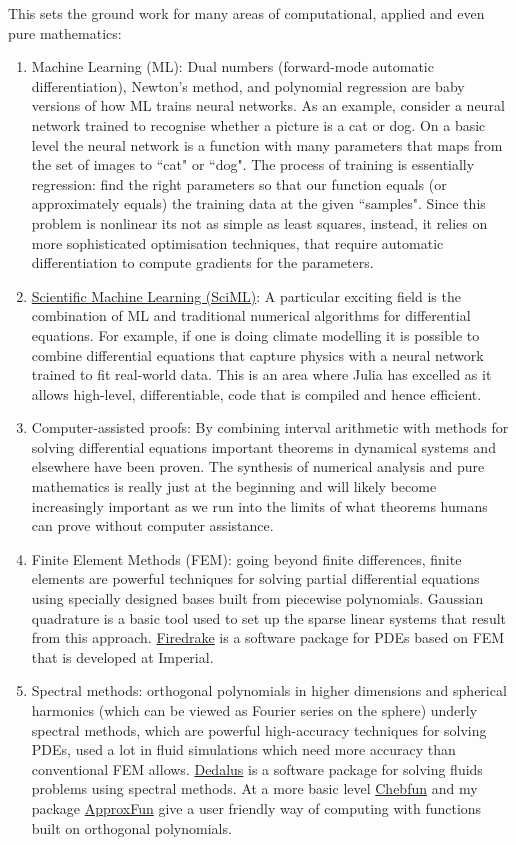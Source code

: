 \documentclass[12pt,a4paper]{book}
\theoremstyle{definition}
\begin{document}
This sets the ground work for many areas of computational, applied and even pure mathematics:

\begin{enumerate}
\item Machine Learning (ML): Dual numbers (forward-mode automatic differentiation), Newton's method, and polynomial regression
 are baby versions of how ML trains neural networks.  As an example, consider a neural network trained to recognise whether a picture
 is a cat or dog. On a basic level the neural network is a function with many parameters that maps from the set of images to ``cat" or ``dog". 
 The process of training is essentially regression: find the right parameters so that our function equals (or approximately equals) the
 training data at the given ``samples". Since this problem is nonlinear its not as simple as least squares, instead, it relies on more sophisticated
 optimisation techniques, that require automatic differentiation to compute gradients for the parameters.
\item \href{https://sciml.ai}{Scientific Machine Learning (SciML)}: A particular exciting field is the combination of ML and traditional numerical algorithms for differential equations.
For example, if one is doing climate modelling it is possible to combine differential equations that capture physics with a neural network  trained to 
fit real-world data. This is an area where Julia has excelled as it allows high-level, differentiable, code that is compiled and hence efficient.
 \item Computer-assisted proofs: By combining interval arithmetic with methods for solving differential equations important theorems in dynamical
 systems and elsewhere have been proven. The synthesis of numerical analysis and pure mathematics is really just at the beginning and will likely
 become increasingly important as we run into the limits of what theorems humans can prove without computer assistance.
\item Finite Element Methods (FEM): going beyond finite differences, finite elements are powerful techniques for solving partial differential
equations using specially designed bases built from piecewise polynomials. Gaussian quadrature is a basic tool used to set up the
sparse linear systems that result from this approach. \href{https://www.firedrakeproject.org}{Firedrake} is a software package for
PDEs based on FEM that is developed at Imperial.
\item Spectral methods: orthogonal polynomials in higher dimensions and spherical harmonics (which can be viewed as Fourier series on the sphere)
underly spectral methods, which are powerful high-accuracy techniques for solving PDEs, used a lot in fluid simulations which
need more accuracy than conventional FEM allows. \href{https://dedalus-project.org}{Dedalus} is a software package for
solving fluids problems using spectral methods. At a more basic level \href{https://www.chebfun.org}{Chebfun} and my package 
\href{https://juliaapproximation.github.io/ApproxFun.jl/latest/}{ApproxFun} give a user friendly way of computing with functions built
on orthogonal polynomials.
\end{enumerate}
\end{document}
